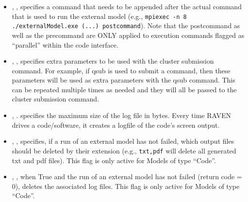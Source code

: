 \begin{itemize}
\item {}, ,
specifies a command that needs to be appended after the actual command that is
used to run the external model (e.g., \texttt{mpiexec -n 8  ./externalModel.exe
(...) postcommand}).
Note that the postcommand as well as the precommand are ONLY applied to
execution commands flagged as ``parallel'' within the code interface.
%

\item {}, ,
  specifies extra parameters to be used with the cluster submission
  command.  For example, if qsub is used to submit a command, then these
  parameters will be used as extra parameters with the qsub command.
  This can be repeated multiple times as needed and they will all be passed
  to the cluster submission command.
%

\item {}, .
specifies the maximum size of the log file in bytes. Every time RAVEN drives a
code/software, it creates a logfile of the code's screen output.
%


\item {}, , specifies, if a run of an external model has not failed, which output
files should be deleted by their extension (e.g.,
\texttt{txt,pdf} will
delete all generated txt and pdf files).
\nb This flag is only active for Models of type ``Code''.
%

\item {}, , when True and
the run of an external model has not failed (return code = 0), deletes
the associated log files.
\nb This flag is only active for Models of type ``Code''.
%
\end{itemize}

